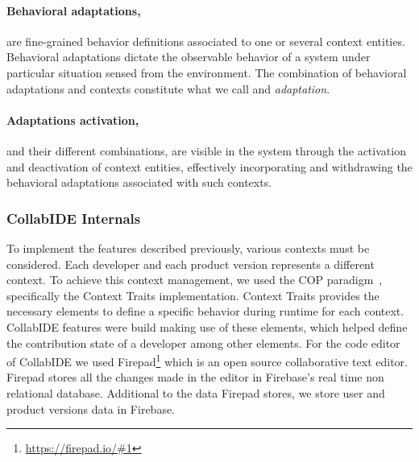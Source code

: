 \paragraph{Behavioral adaptations,} are fine-grained behavior definitions associated to one or several context entities. Behavioral adaptations dictate the observable behavior of a system under particular situation sensed from the environment. The combination of behavioral adaptations and contexts constitute what we call and \emph{adaptation}.

\paragraph{Adaptations activation,} and their different combinations, are visible in the system through the activation and deactivation of context entities, effectively incorporating and withdrawing the behavioral adaptations associated with such contexts.


\subsubsection{CollabIDE Internals}
To implement the features described previously, various contexts must be considered. Each developer 
and each product version represents a different context. To achieve this context management, we used 
the \ac{COP} paradigm~\cite{salvaneschi+12survey}, specifically the Context Traits implementation. 
Context Traits provides the necessary elements to define a specific behavior during runtime for each 
context. CollabIDE features were build making use of these elements, which helped define the 
contribution state of a developer among other elements.
For the code editor of CollabIDE we used Firepad\footnote{\url{https://firepad.io/\#1}} which is an open 
source collaborative text editor. Firepad stores all the changes made in the editor in Firebase’s real 
time non relational database. Additional to the data Firepad stores, we store user and product versions 
data in Firebase.

\endinput